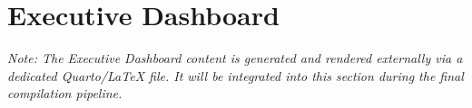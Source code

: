 \section{Executive Dashboard}

\textit{Note: The Executive Dashboard content is generated and rendered externally via a dedicated Quarto/LaTeX file. It will be integrated into this section during the final compilation pipeline.}

\begin{Shaded}
\begin{Highlighting}[]
\end{Highlighting}
\end{Shaded}
